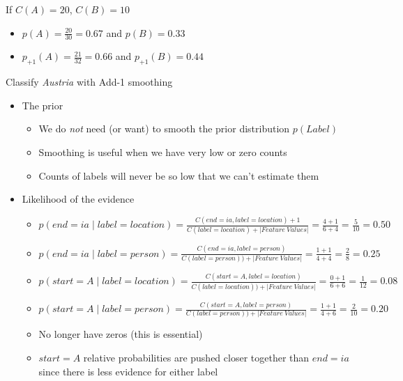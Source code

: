 \documentclass[11pt,letterpaper]{article}
\begin{document}
\begin{itemize}
\begin{itemize}
        If $C(A)=20$, $C(B)=10$
        \begin{itemize}
          \item $p(A)=\frac{20}{30} = \mathbf{0.67}$ and 
                $p(B) = \mathbf{0.33}$
          \item $p_{+1}(A)=\frac{21}{32} = \mathbf{0.66}$ and 
                $p_{+1}(B) = \mathbf{0.44}$
        \end{itemize}
    \end{itemize}
\end{itemize}


Classify \textit{Austria} with Add-1 smoothing

\begin{itemize}
  \item The prior
    \begin{itemize}
      \item We do \textit{not} need (or want) to smooth the prior distribution $p(Label)$
      \item Smoothing is useful when we have very low or zero counts
      \item Counts of labels will never be so low that we can't estimate them
    \end{itemize}

  \item Likelihood of the evidence
    \begin{itemize}
      \item $p(end=ia \mid label=location) = \frac{C(end=ia, label=location)+1}{C(label=location)+|Feature~Values|} = \frac{4+1}{6+4} = \frac{5}{10} = 0.50$
      \item $p(end=ia \mid label=person) = \frac{C(end=ia, label=person)}{C(label=person))+|Feature~Values|} = \frac{1+1}{4+4} = \frac{2}{8} = 0.25$
      \\
      \item $p(start=A \mid label=location) = \frac{C(start=A, label=location)}{C(label=location))+|Feature~Values|} = \frac{0+1}{6+6} = \frac{1}{12} = 0.08$
      \item $p(start=A \mid label=person) = \frac{C(start=A, label=person)}{C(label=person))+|Feature~Values|} = \frac{1+1}{4+6} = \frac{2}{10} = 0.20$
      \\
      \item No longer have zeros (this is essential)
      \item $start=A$ relative probabilities are pushed closer together than $end=ia$ since there is less evidence for either label


\end{itemize}
\end{itemize}
\end{document}
